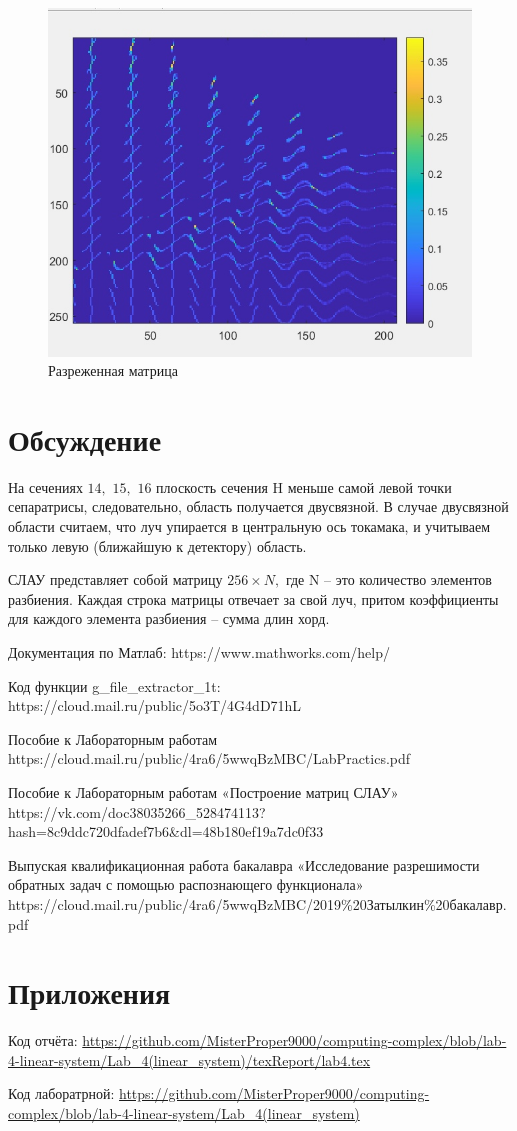 \documentclass[a4]{article}
\begin{document}
\begin{figure}[H]
    \centering
    \caption{Разреженная матрица}
    \includegraphics{pic22.png}
\end{figure}

\section{Обсуждение}
На сечениях $14,$ $15,$ $16$ плоскость сечения H меньше самой левой точки сепаратрисы, следовательно, область получается двусвязной.
В случае двусвязной области считаем, что луч упирается в центральную ось токамака, и учитываем только левую (ближайшую к детектору) область.
	
СЛАУ представляет собой матрицу $256\times N,$ где N – это количество элементов разбиения.
Каждая строка матрицы отвечает за свой луч, притом коэффициенты для каждого элемента разбиения – сумма длин хорд.


\begin{thebibliography}{}
      Документация по Матлаб: https://www.mathworks.com/help/

     Код функции g\_file\_extractor\_1t: https://cloud.mail.ru/public/5o3T/4G4dD71hL
    
    Пособие к Лабораторным работам https://cloud.mail.ru/public/4ra6/5wwqBzMBC/LabPractics.pdf
    
    Пособие к Лабораторным работам «Построение матриц СЛАУ» https://vk.com/doc38035266\_528474113?hash=8c9ddc720dfadef7b6\&dl=48b180ef19a7dc0f33
    
    Выпуская квалификационная работа бакалавра «Исследование разрешимости обратных задач с помощью распознающего функционала» https://cloud.mail.ru/public/4ra6/5wwqBzMBC/2019\%20Затылкин\%20бакалавр.pdf
\end{thebibliography}

\section{Приложения}

Код отчёта:\; \url{https://github.com/MisterProper9000/computing-complex/blob/lab-4-linear-system/Lab_4(linear\_system)/texReport/lab4.tex}

Код лаборатрной:\; \url{https://github.com/MisterProper9000/computing-complex/blob/lab-4-linear-system/Lab_4(linear\_system)}
\end{document}
